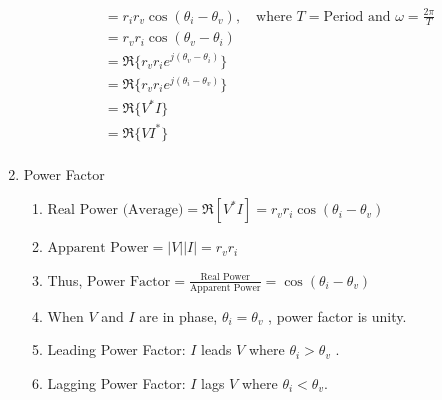 \begin{enumerate}
\begin{align*}
        &= r_i r_v \cos(\theta_i - \theta_v), \quad \text{where } T = \text{Period and } \omega = \frac{2\pi}{T} \\
        &= r_v r_i \cos(\theta_v - \theta_i) \\
        &= \Re\{r_v r_i e^{j(\theta_v - \theta_i)}\} \\
        &= \Re\{r_v r_i e^{j(\theta_i - \theta_v)}\} \\
        &= \Re\{V^* I\} \\
        &= \Re\{VI^*\} \\
        \end{align*}
        \item Power Factor
        \begin{enumerate}
            \item $\text{Real Power (Average)} = \Re[V^*I] = r_vr_i\cos(\theta_i-\theta_v)$
            \item  $\displaystyle \text{Apparent Power} = |V||I| = r_vr_i$
            \item Thus, $\displaystyle \text{Power Factor} = \frac{\text{Real Power}}{\text{Apparent Power}} = \cos(\theta_i-\theta_v)$ 
            \item When $V$ and $I$ are in phase, $\theta_i = \theta_v$ , power factor is unity.
            \item Leading Power Factor: $I$ leads $V$ where $\theta_i > \theta_v$ .
            \item Lagging Power Factor: $I$ lags $V$ where $\theta_i < \theta_v$.
        \end{enumerate}
\end{enumerate}
